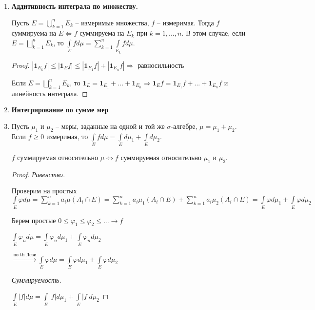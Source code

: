 \begin{enumerate}
    \item \textbf{Аддитивность интеграла по множеству.}
    
    Пусть $E=\bigcup\limits_{k=1}^n E_k$ – измеримые множества, $f$ – измеримая. Тогда $f$ суммируема на $E\Leftrightarrow 
    f$ суммируема на $E_k$ при $k=1, ..., n$. B этом случае, если $E=\bigsqcup\limits_{k=1}^n E_k$, то 
    $\int\limits_E f d\mu = \sum\limits_{k=1}^n \int\limits_{E_k} fd \mu$.

    \begin{proof}
        $|\mathbf{1}_{E_k} f|\leq |\mathbf{1}_{E} f|\leq |\mathbf{1}_{E_1} f| + |\mathbf{1}_{E_n} f|\Rightarrow$ равносильность

        Если $E=\bigsqcup\limits_{k=1}^n E_k$, то $\mathbf{1}_{E}=\mathbf{1}_{E_1}+...+\mathbf{1}_{E_n}\Rightarrow 
        \mathbf{1}_{E} f=\mathbf{1}_{E_1} f + ... + \mathbf{1}_{E_n} f$ и линейность интеграла.
    \end{proof}

    \item \textbf{Интегрирование по сумме мер}
    \item 
    Пусть $\mu_1$ и $\mu_2$ – меры, заданные на одной и той же $\sigma$-алгебре, $\mu = \mu_1 + \mu_2$.
    Если $f\geq 0$ измеримая, то $\int\limits_E f d\mu = \int\limits_E d \mu_1 + \int\limits_E d\mu_2$.

    $f$ суммируемая относительно $\mu\Leftrightarrow f$ суммируемая относительно $\mu_1$ и $\mu_2$.
    
    \begin{proof}
        \textit{Равенство.}

        Проверим на простых $\int\limits_E \varphi d\mu = \sum\limits_{k=1}^n a_i \mu (A_i \cap E)=
        \sum\limits_{k=1}^n a_i \mu_1 (A_i \cap E)+\sum\limits_{k=1}^n a_i \mu_2 (A_i \cap E)=
        \int\limits_E \varphi d\mu_1+\int\limits_E \varphi d\mu_2$

        Берем простые $0\leq \varphi_1 \leq \varphi_2\leq ...\rightarrow f$

        $\int\limits_E \varphi_n d\mu=\int\limits_E \varphi_n d\mu_1+\int\limits_E \varphi_n d\mu_2$

        $\overset{\text{по th Леви}}{\rightarrow} \int\limits_E \varphi d\mu= \int\limits_E \varphi d\mu_1 + \int\limits_E \varphi d\mu_2$
        
        \textit{Суммируемость.}

        $\int\limits_E |f|d\mu = \int\limits_E |f|d\mu_1+\int\limits_E |f|d\mu_2$
    \end{proof}
\end{enumerate}

